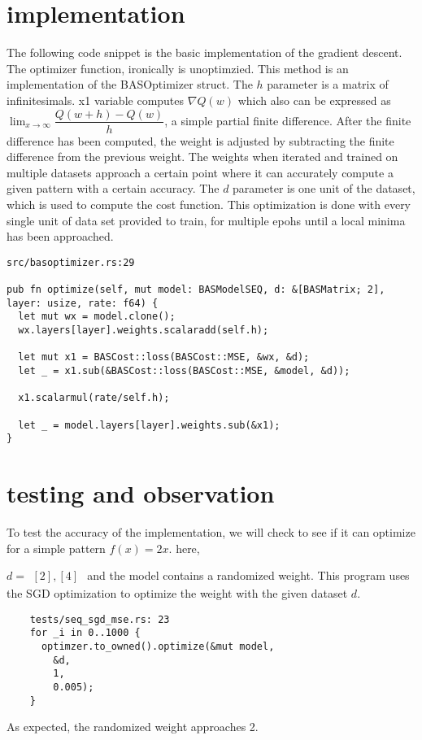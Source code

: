 \documentclass[a4paper,11pt]{article}
\begin{document}
  \section{implementation}
  The following code snippet is the basic implementation of the gradient descent. 
  The optimizer function, ironically is unoptimzied. 
  This method is an implementation of the BASOptimizer struct. The \(h\) parameter is a matrix of infinitesimals.
  x1 variable computes \(\nabla Q(w)\) which also can be expressed as
  \(\lim_{x \to \infty}\dfrac{Q(w+h)-Q(w)}{h}\), a simple partial finite difference.
  After the finite difference has been computed, the weight is adjusted by subtracting the finite difference from the previous weight. The weights when iterated and trained on multiple datasets approach a certain point where it can accurately compute a given pattern with a certain accuracy. 
  The \(d\) parameter is one unit of the dataset, which is used to compute the 
  cost function. This optimization is done with every single unit of data set provided to train, for multiple epohs until a local minima has been approached.
  \begin{verbatim}
src/basoptimizer.rs:29

pub fn optimize(self, mut model: BASModelSEQ, d: &[BASMatrix; 2], layer: usize, rate: f64) {
  let mut wx = model.clone();
  wx.layers[layer].weights.scalaradd(self.h);

  let mut x1 = BASCost::loss(BASCost::MSE, &wx, &d);
  let _ = x1.sub(&BASCost::loss(BASCost::MSE, &model, &d));

  x1.scalarmul(rate/self.h);

  let _ = model.layers[layer].weights.sub(&x1);
}
    \end{verbatim}
  
    \section{testing and observation}
    To test the accuracy of the implementation, we will check to see if it can 
    optimize for a simple pattern \(f(x) = 2x\). \newline
    here,

    \(d = \begin{matrix} 
      [2], [4]
    \end{matrix}\) and the model contains a randomized weight.
    This program uses the SGD optimization to optimize the weight with the given dataset \(d\).
    \begin{verbatim}
    tests/seq_sgd_mse.rs: 23
    for _i in 0..1000 {
      optimzer.to_owned().optimize(&mut model, 
        &d, 
        1, 
        0.005);
    }
    \end{verbatim}
    As expected, the randomized weight approaches 2.
\end{document}

